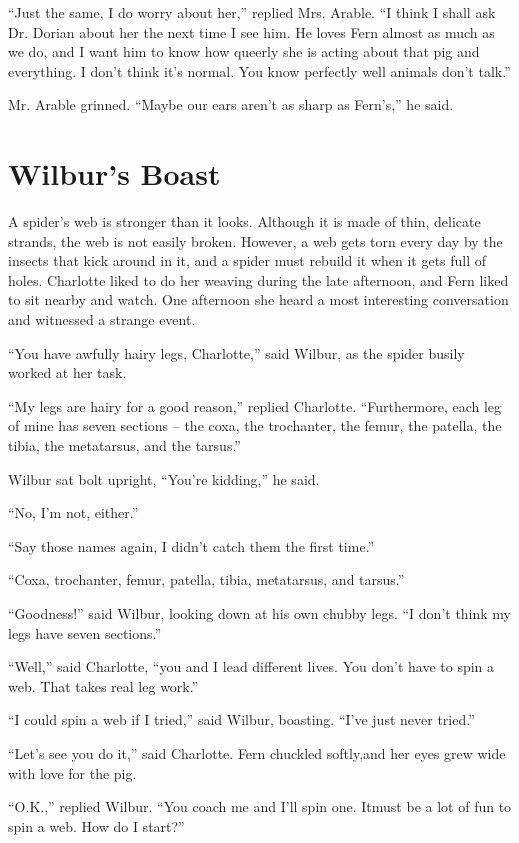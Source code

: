 \documentclass[a4paper, oneside]{book}
\begin{document}
 ``Just the same, I do worry about her,'' replied Mrs. Arable. ``I
think I shall ask Dr. Dorian about her the next time I see him. He
loves Fern almost as much as we do, and I want him to know how
queerly she is acting about that pig and everything. I don't think
it's normal. You know perfectly well animals don't talk.''

 Mr. Arable grinned. ``Maybe our ears aren't as sharp as Fern's,'' he
said. 


  \chapter{Wilbur's Boast}
A spider's web is stronger than it looks. Although it is made of
thin, delicate strands, the web is not easily broken. However, a web
gets torn every day by the insects that kick around in it, and a
spider must rebuild it when it gets full of holes. Charlotte liked to
do her weaving during the late afternoon, and Fern liked to sit
nearby and watch. One afternoon she heard a most interesting
conversation and witnessed a strange event.

 ``You have awfully hairy legs, Charlotte,'' said Wilbur, as the
spider busily worked at her task.

 ``My legs are hairy for a good reason,'' replied Charlotte.
``Furthermore, each leg of mine has seven sections -- the coxa, the
trochanter, the femur, the patella, the tibia, the metatarsus, and
the tarsus.''

Wilbur sat bolt upright, ``You're kidding,'' he said.

 ``No, I'm not, either.''
 
 ``Say those names again, I didn't catch them the first time.''
 
 ``Coxa, trochanter, femur, patella, tibia, metatarsus, and tarsus.''
 
 ``Goodness!'' said Wilbur, looking down at his own chubby legs. ``I
don't think my legs have seven sections.''

 ``Well,'' said Charlotte, ``you and I lead different lives. You don't
have to spin a web. That takes real leg work.''

 ``I could spin a web if I tried,'' said Wilbur, boasting. ``I've just
never tried.''

``Let’s see you do it,'' said Charlotte. Fern chuckled softly,and her eyes grew wide with love for the pig.

``O.K.,'' replied Wilbur. ``You coach me and I'll spin one. Itmust be a lot of fun to spin a web. How do I start?''
\end{document}
